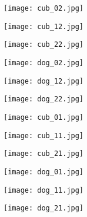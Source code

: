 \begin{figure*}[ht]
    \centering
    \begin{subfigure}{0.16\linewidth}
        \centering
		\texttt{[image: cub\_02.jpg]}
    \end{subfigure}
    \begin{subfigure}{0.16\linewidth}
        \centering
		\texttt{[image: cub\_12.jpg]}
    \end{subfigure}
    \begin{subfigure}{0.16\linewidth}
        \centering
		\texttt{[image: cub\_22.jpg]}
    \end{subfigure}
    \begin{subfigure}{0.16\linewidth}
        \centering
		\texttt{[image: dog\_02.jpg]}
    \end{subfigure}
    \begin{subfigure}{0.16\linewidth}
        \centering
		\texttt{[image: dog\_12.jpg]}
    \end{subfigure}
    \begin{subfigure}{0.16\linewidth}
        \centering
		\texttt{[image: dog\_22.jpg]}
    \end{subfigure}
    \begin{subfigure}{0.16\linewidth}
        \centering
		\texttt{[image: cub\_01.jpg]}
    \end{subfigure}
    \begin{subfigure}{0.16\linewidth}
        \centering
		\texttt{[image: cub\_11.jpg]}
    \end{subfigure}
    \begin{subfigure}{0.16\linewidth}
        \centering
		\texttt{[image: cub\_21.jpg]}
    \end{subfigure}
    \begin{subfigure}{0.16\linewidth}
        \centering
		\texttt{[image: dog\_01.jpg]}
    \end{subfigure}
    \begin{subfigure}{0.16\linewidth}
        \centering
		\texttt{[image: dog\_11.jpg]}
    \end{subfigure}
    \begin{subfigure}{0.16\linewidth}
        \centering
		\texttt{[image: dog\_21.jpg]}
    \end{subfigure}
    \begin{subfigure}{0.16\linewidth}

\end{subfigure}
\end{figure*}
